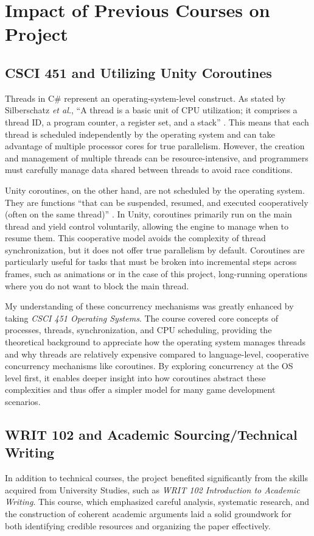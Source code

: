 \documentclass[a4paper, 12pt, one column, aas_macros]{article}
\begin{document}
\section{Impact of Previous Courses on Project}
\subsection{CSCI 451 and Utilizing Unity Coroutines}
Threads in C\# represent an operating-system-level construct. As stated by Silberschatz \emph{et al.}, ``A thread is a basic unit of CPU utilization; it comprises a thread ID, a program counter, a register set, and a stack'' \cite{silberschatz}. This means that each thread is scheduled independently by the operating system and can take advantage of multiple processor cores for true parallelism. However, the creation and management of multiple threads can be resource-intensive, and programmers must carefully manage data shared between threads to avoid race conditions. 

Unity coroutines, on the other hand, are not scheduled by the operating system. They are functions ``that can be suspended, resumed, and executed cooperatively (often on the same thread)'' \cite{nosenko}. In Unity, coroutines primarily run on the main thread and yield control voluntarily, allowing the engine to manage when to resume them. This cooperative model avoids the complexity of thread synchronization, but it does not offer true parallelism by default. Coroutines are particularly useful for tasks that must be broken into incremental steps across frames, such as animations or in the case of this project, long-running operations where you do not want to block the main thread.

My understanding of these concurrency mechanisms was greatly enhanced by taking \textit{CSCI 451 Operating Systems}. The course covered core concepts of processes, threads, synchronization, and CPU scheduling, providing the theoretical background to appreciate how the operating system manages threads and why threads are relatively expensive compared to language-level, cooperative concurrency mechanisms like coroutines. By exploring concurrency at the OS level first, it enables deeper insight into how coroutines abstract these complexities and thus offer a simpler model for many game development scenarios.

\subsection{WRIT 102 and Academic Sourcing/Technical Writing}
In addition to technical courses, the project benefited significantly from the skills acquired from University Studies, such as \textit{WRIT 102 Introduction to Academic Writing}. This course, which emphasized careful analysis, systematic research, and the construction of coherent academic arguments laid a solid groundwork for both identifying credible resources and organizing the paper effectively.
\end{document}
